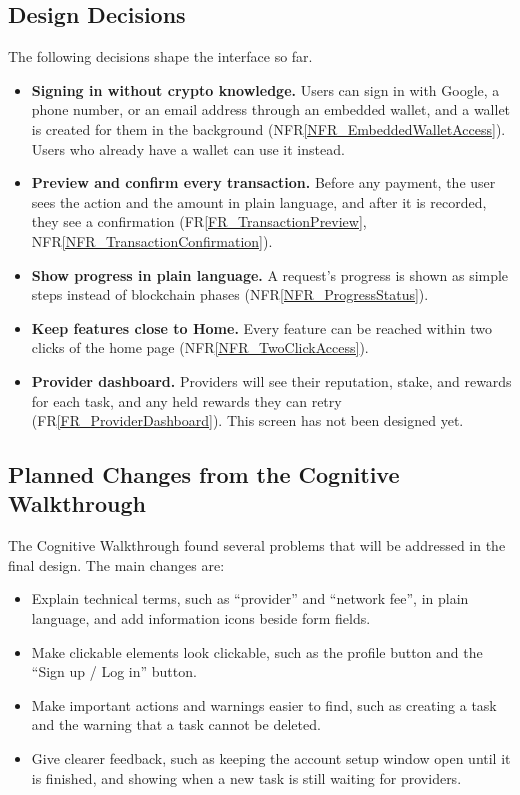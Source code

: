 \documentclass[12pt, titlepage]{article}
\newcommand{\rref}[1]{FR\ref{#1}}
\newcommand{\nfrref}[1]{NFR\ref{#1}}
\begin{document}
\subsection{Design Decisions}

The following decisions shape the interface so far.

\begin{itemize}
\item \textbf{Signing in without crypto knowledge.} Users can sign in with
  Google, a phone number, or an email address through an embedded wallet, and a wallet is created for
  them in the background (\nfrref{NFR_EmbeddedWalletAccess}). Users who
  already have a wallet can use it instead.
\item \textbf{Preview and confirm every transaction.} Before any payment, the
  user sees the action and the amount in plain language, and after it is
  recorded, they see a confirmation (\rref{FR_TransactionPreview},
  \nfrref{NFR_TransactionConfirmation}).
\item \textbf{Show progress in plain language.} A request's progress is shown
  as simple steps instead of blockchain phases (\nfrref{NFR_ProgressStatus}).
\item \textbf{Keep features close to Home.} Every feature can be reached
  within two clicks of the home page (\nfrref{NFR_TwoClickAccess}).
\item \textbf{Provider dashboard.} Providers will see their reputation, stake,
  and rewards for each task, and any held rewards they can retry
  (\rref{FR_ProviderDashboard}). This screen has not been designed yet.
\end{itemize}

\subsection{Planned Changes from the Cognitive Walkthrough}

The Cognitive Walkthrough found several problems that will be addressed in the
final design. The main changes are:

\begin{itemize}
\item Explain technical terms, such as ``provider'' and ``network fee'', in
  plain language, and add information icons beside form fields.
\item Make clickable elements look clickable, such as the profile button and
  the ``Sign up / Log in'' button.
\item Make important actions and warnings easier to find, such as creating a
  task and the warning that a task cannot be deleted.
\item Give clearer feedback, such as keeping the account setup window open
  until it is finished, and showing when a new task is still waiting for
  providers.
\end{itemize}
\end{document}
